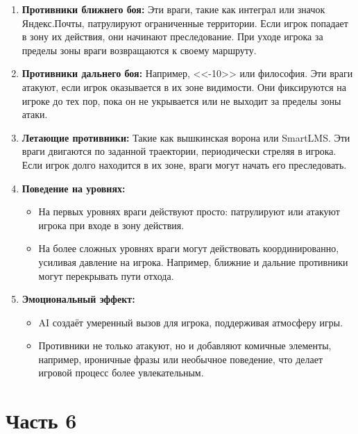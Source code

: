 \documentclass{article}
\begin{document}
\begin{enumerate}
    \item \textbf{Противники ближнего боя:}  
    Эти враги, такие как интеграл или значок Яндекс.Почты, патрулируют ограниченные территории. Если игрок попадает в зону их действия, они начинают преследование. При уходе игрока за пределы зоны враги возвращаются к своему маршруту.  

    \item \textbf{Противники дальнего боя:}  
    Например, <<-10>> или философия. Эти враги атакуют, если игрок оказывается в их зоне видимости. Они фиксируются на игроке до тех пор, пока он не укрывается или не выходит за пределы зоны атаки.  

    \item \textbf{Летающие противники:}  
    Такие как вышкинская ворона или SmartLMS. Эти враги двигаются по заданной траектории, периодически стреляя в игрока. Если игрок долго находится в их зоне, враги могут начать его преследовать.  

    \item \textbf{Поведение на уровнях:}  
    \begin{itemize}
        \item На первых уровнях враги действуют просто: патрулируют или атакуют игрока при входе в зону действия.  
        \item На более сложных уровнях враги могут действовать координированно, усиливая давление на игрока. Например, ближние и дальние противники могут перекрывать пути отхода.  
    \end{itemize}
    \item \textbf{Эмоциональный эффект:}  
    \begin{itemize}
        \item AI создаёт умеренный вызов для игрока, поддерживая атмосферу игры.  
        \item Противники не только атакуют, но и добавляют комичные элементы, например, ироничные фразы или необычное поведение, что делает игровой процесс более увлекательным.  
    \end{itemize}
\end{enumerate}

\section{Часть 6}
\end{document}
